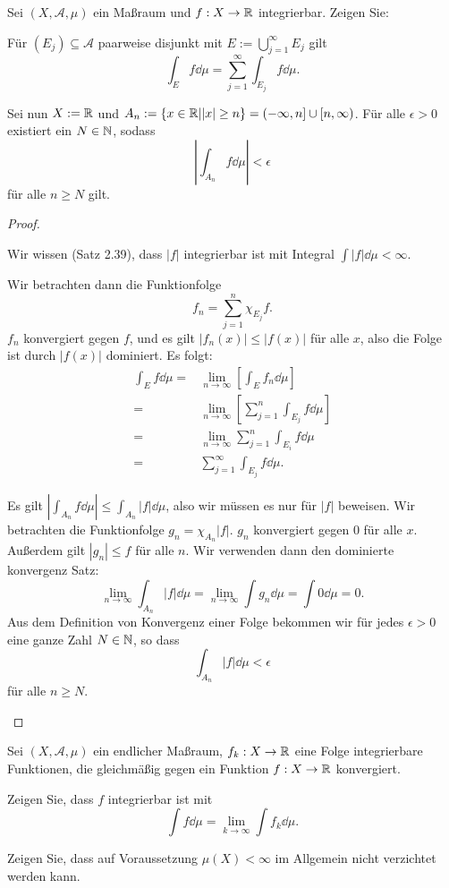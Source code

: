 \begin{Problem}
	Sei $(X,\mathcal{A},\mu)$ ein Maßraum und $f:X\to \mathbb{R}$ integrierbar. Zeigen Sie:
	\begin{parts}
		\item F\"{u}r $(E_j)\subseteq \mathcal{A}$ paarweise disjunkt mit $E:=\bigcup_{j=1}^\infty E_j$ gilt
			\[
				\int_E f\dd{\mu}=\sum_{j=1}^\infty \int_{E_j} f\dd{\mu}
			.\] 
		\item Sei nun $X:=\mathbb{R}$ und $A_n:=\left\{ x\in \mathbb{R}| |x|\ge n \right\} =(-\infty,n] \cup [n,\infty)$. F\"{u}r alle $\epsilon>0$ existiert ein $N\in \mathbb{N}$, sodass
			\[
				\left| \int_{A_n}f\dd{\mu} \right| <\epsilon
			\]
			f\"{u}r alle $n\ge N$ gilt.
	\end{parts}
\end{Problem}
\begin{proof}
	\begin{parts}
	\item Wir wissen (Satz 2.39), dass $|f|$ integrierbar ist mit Integral $\int |f|\dd{\mu}<\infty$. 

		Wir betrachten dann die Funktionfolge
		\[
			f_n=\sum_{j=1}^n \chi_{E_j}f
		.\] 
		$f_n$ konvergiert gegen $f$, und es gilt $|f_n(x)|\le |f(x)|$ f\"{u}r alle $x$, also die Folge ist durch $|f(x)|$ dominiert. Es folgt:
		\begin{align*}
			\int_E f\dd{\mu}=&\lim_{n \to \infty} \left[ \int_E f_n \dd{\mu} \right] \\
			=& \lim_{n \to \infty}\left[ \sum_{j=1}^n \int_{E_j}f\dd{\mu} \right] \\
			=&\lim_{n \to \infty} \sum_{j=1}^n\int_{E_i} f\dd{\mu}\\
			=&\sum_{j=1}^\infty \int_{E_j}f\dd{\mu}.
		\end{align*}
	\item Es gilt $\left| \int_{A_n}f\dd{\mu} \right| \le \int_{A_n}|f|\dd{\mu}$, also wir müssen es nur f\"{u}r $|f|$ beweisen. Wir betrachten die Funktionfolge $g_n=\chi_{A_n}|f|$. $g_n$ konvergiert gegen $0$ f\"{u}r alle $x$. Außerdem gilt $|g_n|\le f$ f\"{u}r alle $n$. Wir verwenden dann den dominierte konvergenz Satz:
		\[
			\lim_{n \to \infty} \int_{A_n}|f|\dd{\mu}=\lim_{n \to \infty} \int g_n\dd{\mu}=\int 0\dd{\mu}=0
		.\]
		Aus dem Definition von Konvergenz einer Folge bekommen wir f\"{u}r jedes $\epsilon>0$ eine ganze Zahl $N\in \mathbb{N}$, so dass
		\[
			\int_{A_n}|f|\dd{\mu}<\epsilon
		\]
		f\"{u}r alle $n\ge N$.\qedhere
	\end{parts}
\end{proof}
\begin{Problem}
	Sei $(X,\mathcal{A},\mu)$ ein endlicher Maßraum, $f_k:X\to \mathbb{R}$ eine Folge integrierbare Funktionen, die gleichmäßig gegen ein Funktion $f:X\to \mathbb{R}$ konvergiert.
	\begin{parts}
	\item Zeigen Sie, dass $f$ integrierbar ist mit
		\[
			\int f\dd{\mu}=\lim_{k \to \infty} \int f_k\dd{\mu}
		.\] 
	\item Zeigen Sie, dass auf Voraussetzung $\mu(X)<\infty$ im Allgemein nicht verzichtet werden kann.
	\end{parts}
\end{Problem}

